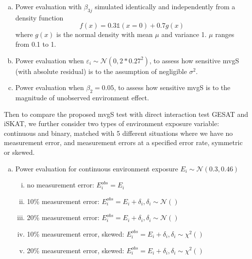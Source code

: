 \documentclass{article}
\begin{document}
\begin{enumerate}[(a)]

	\item Power evaluation with $\beta_{3j}$ simulated identically and independently from a density function
	 $$f(x)=0.3\mathds{1}(x=0)+0.7g(x)$$ where $g(x)$ is the normal density with mean $\mu$ and variance 1.  $\mu$ ranges from 0.1 to 1.
	
	\item  Power evaluation when $\varepsilon_i\sim \mathcal{N}(0,2*0.27^2)$, to assess how sensitive mvgS (with absolute residual) is to the assumption of negligible $\sigma^2$.
	
	\item Power evaluation when $\beta_2 = 0.05$, to assess how sensitive mvgS is to the magnitude of unobserved environment effect.
\end{enumerate}

Then to compare the proposed mvgS test with direct interaction test GESAT and iSKAT, we further consider two types of environment exposure variable: continuous and binary, matched with 5 different situations where we have no measurement error, and  measurement errors at a specified error rate, symmetric or skewed.


\begin{enumerate}[(d)]
	\item Power evaluation for continuous environment exposure	$E_i \sim \mathcal{N}(0.3,0.46)$
	\begin{enumerate}[(i)]
		\item no measurement error: $E^{obs}_i=E_i$
		\item 10\% measurement error: $E^{obs}_i=E_i+\delta_i, \delta_i\sim\mathcal{N}()$
		\item 20\% measurement error: $E^{obs}_i=E_i+\delta_i, \delta_i\sim\mathcal{N}()$
		\item 10\% measurement error, skewed: $E^{obs}_i=E_i+\delta_i, \delta_i\sim\chi^2()$
		\item 20\% measurement error, skewed: $E^{obs}_i=E_i+\delta_i, \delta_i\sim\chi^2()$
	\end{enumerate}

\end{enumerate}
\end{document}
